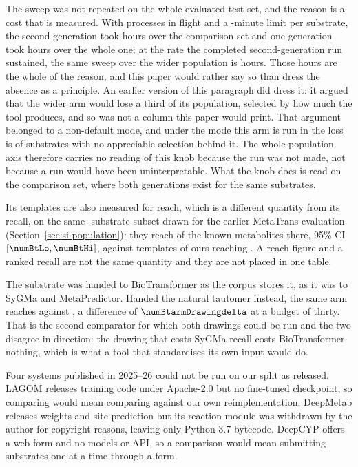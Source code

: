 \documentclass[journal=jcisd8,manuscript=suppinfo,layout=onecolumn]{achemso}
\begin{document}
The sweep was not repeated on the whole evaluated test set, and the reason is a cost that is
measured. With \numBtstepsCostWorkers{} processes in flight and a
\numBtstepsCostTimeoutmin{}-minute limit per substrate, the second generation took
\numBtstepsCostTwohours{} hours over the comparison set and one generation took
\numBtstepsCostOnehours{} hours over the whole one; at the rate the completed second-generation
run sustained, the same sweep over the wider population is \numBtstepsCostProjected{} hours. Those
hours are the whole of the reason, and this paper would rather say so than dress the absence as a
principle. An earlier version of this paragraph did dress it: it argued that the wider arm would
lose a third of its population, selected by how much the tool produces, and so was not a column this paper would print. That argument belonged to a non-default mode, and under the mode this arm is run
in the loss is \numBtstepsLost{} of \numBtstepsAttempted{} substrates with no appreciable
selection behind it. The whole-population axis therefore carries no reading of this knob because
the run was not made, not because a run would have been uninterpretable. What the knob does is
read on the comparison set, where both generations exist for the same substrates.

Its templates are also measured for reach, which is a different quantity from its recall, on the
same \numBtN{}-substrate subset drawn for the earlier MetaTrans evaluation
(Section~\ref{sec:si-population}): they reach \numBtReach{} of the
known metabolites there, 95\% CI $[\numBtLo, \numBtHi]$, against \numBankRules{} templates of ours
reaching \numBtOurreach{}. A reach figure and a ranked recall are not the same quantity and they
are not placed in one table.

The substrate was handed to BioTransformer as the corpus stores it, as it was to SyGMa and
MetaPredictor. Handed the natural tautomer instead, the same arm reaches
\numBtarmDrawnrecallThreeZero{} against \numBtarmRecallThreeZero{}, a difference of
$\numBtarmDrawingdelta$ at a budget of thirty. That is the second comparator for which both
drawings could be run and the two disagree in direction: the drawing that costs SyGMa recall costs
BioTransformer nothing, which is what a tool that standardises its own input would do.

Four systems published in 2025--26 could not be run on our split as released. LAGOM
\citep{Larsson_2025} releases training code under Apache-2.0 but no fine-tuned checkpoint, so
comparing would mean comparing against our own reimplementation. DeepMetab \citep{Zhou_2025}
releases weights and site prediction but its reaction module was withdrawn by the author for
copyright reasons, leaving only Python 3.7 bytecode. DeepCYP \citep{Zhou_2026} offers a web form
and no models or API, so a comparison would mean submitting substrates one at a time through a
form.
\end{document}
